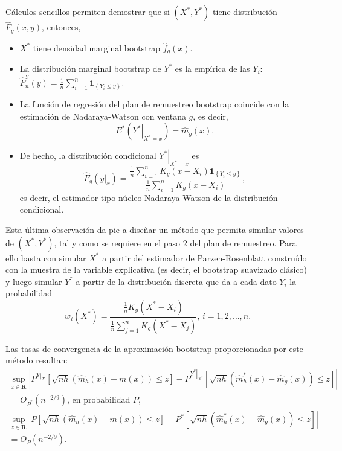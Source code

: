 \documentclass[]{book}
\theoremstyle{definition}
\theoremstyle{definition}
\theoremstyle{definition}
\theoremstyle{remark}
\begin{document}
Cálculos sencillos permiten demostrar que si
\(\left( X^{\ast},Y^{\ast} \right)\) tiene distribución
\(\hat{F}_{g}\left( x,y \right)\), entonces,

\begin{itemize}
\item
  \(X^{\ast}\) tiene densidad marginal bootstrap
  \(\hat{f}_{g}\left( x \right)\).
\item
  La distribución marginal bootstrap de \(Y^{\ast}\) es la empírica de
  las \(Y_i\):
  \(\hat{F}_n^{Y}\left( y \right) =\frac{1}{n} \sum_{i=1}^{n}\mathbf{1}_{\left\{ Y_i\leq y\right\} }\).
\item
  La función de regresión del plan de remuestreo bootstrap coincide con
  la estimación de Nadaraya-Watson con ventana \(g\), es decir,
  \[E^{\ast}\left( \left. Y^{\ast}\right\vert _{X^{\ast}=x} \right)
  =\hat{m}_{g}\left( x \right).\]
\item
  De hecho, la distribución condicional
  \(\left. Y^{\ast}\right\vert _{X^{\ast}=x}\) es
  \[\hat{F}_{g}\left( \left. y\right\vert _{x} \right) =\frac{\frac{1}{n}
  \sum_{i=1}^{n}K_{g}\left( x-X_i \right) \mathbf{1}_{\left\{ Y_i\leq
  y\right\} }}{\frac{1}{n}\sum_{i=1}^{n}K_{g}\left( x-X_i \right)},\] es
  decir, el estimador tipo núcleo Nadaraya-Watson de la distribución
  condicional.
\end{itemize}

Esta última observación da pie a diseñar un método que permita simular
valores de \(\left( X^{\ast},Y^{\ast} \right)\), tal y como se requiere
en el paso 2 del plan de remuestreo. Para ello basta con simular
\(X^{\ast}\) a partir del estimador de Parzen-Rosenblatt construído con
la muestra de la variable explicativa (es decir, el bootstrap suavizado
clásico) y luego simular \(Y^{\ast}\) a partir de la distribución
discreta que da a cada dato \(Y_i\) la probabilidad
\[w_i\left( X^{\ast} \right) =\frac{\frac{1}{n}K_{g}\left( X^{\ast}
-X_i \right)}{\frac{1}{n}\sum_{j=1}^{n}K_{g}\left( X^{\ast}-X_j \right)}
\text{, }i=1,2,\ldots ,n\text{.}\]

Las tasas de convergencia de la aproximación bootstrap proporcionadas
por este método resultan: \[\begin{gathered}
\sup_{z\in \boldsymbol{R}}\left\vert P^{\left. Y\right\vert _{X}}\left[ 
\sqrt{nh}\left( \hat{m}_{h}\left( x \right) -m\left( x \right) \right) \leq z
\right]  -P^{\left. Y^{\ast}\right\vert _{X^{\ast}}}\left[ \sqrt{nh}\left( 
\hat{m}_{h}^{\ast}\left( x \right) -\hat{m}_{g}\left( x \right) \right) \leq z
\right] \right\vert \\
=O_{P^{\ast}}\left( n^{-2/9} \right) \text{, en probabilidad }P, \\
\sup_{z\in \boldsymbol{R}}\left\vert P\left[ \sqrt{nh}\left( \hat{m}
_{h}\left( x \right) -m\left( x \right) \right) \leq z\right] -P^{\ast}\left[ 
\sqrt{nh}\left( \hat{m}_{h}^{\ast}\left( x \right) -\hat{m}_{g}\left(
x \right) \right) \leq z\right] \right\vert \\
=O_{P}\left( n^{-2/9} \right).
\end{gathered}\]
\end{document}
